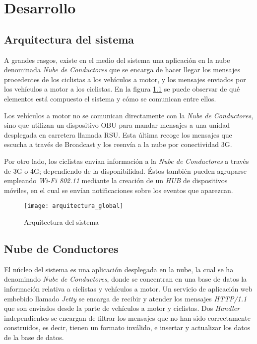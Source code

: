 \chapter{Desarrollo}\label{cha:solucion}

\section{Arquitectura del sistema}\label{section:arquitecturaSistema}
A grandes rasgos, existe en el medio del sistema una aplicación en la nube denominada \emph{Nube de Conductores} que se encarga de hacer llegar los mensajes procedentes de los ciclistas a los vehículos a motor, y los mensajes enviados por los vehículos a motor a los ciclistas. En la figura \ref{fig:ArquitecturaSistema} se puede observar de qué elementos está compuesto el sistema y cómo se comunican entre ellos.

Los vehículos a motor no se comunican directamente con la \emph{Nube de Conductores}, sino que utilizan un dispositivo OBU para mandar mensajes a una unidad desplegada en carretera llamada RSU. Esta última recoge los mensajes que escucha a través de Broadcast y los reenvía a la nube por conectividad 3G.

Por otro lado, los ciclistas envían información a la \emph{Nube de Conductores} a través de 3G o 4G; dependiendo de la disponibilidad. \'Estos también pueden agruparse empleando \emph{Wi-Fi 802.11} mediante la creación de un \emph{HUB} de dispositivos móviles, en el cual se envían notificaciones sobre los eventos que aparezcan.

\begin{figure}[H]
	\begin{center}
		\texttt{[image: arquitectura\_global]}
		\caption{Arquitectura del sistema}
		\label{fig:ArquitecturaSistema}
	 \end{center}
\end{figure}

\section{Nube de Conductores}\label{section:NubeConductores}
El núcleo del sistema es una aplicación desplegada en la nube, la cual se ha denominado \emph{Nube de Conductores}, donde se concentran en una base de datos la información relativa a ciclistas y vehículos a motor. Un servicio de aplicación web embebido llamado \emph{Jetty} se encarga de recibir y atender los mensajes \emph{HTTP/1.1} que son enviados desde la parte de vehículos a motor y ciclistas. Dos \emph{Handler} independientes se encargan de filtrar los mensajes que no han sido correctamente construidos, es decir, tienen un formato inválido, e insertar y actualizar los datos de la base de datos.

